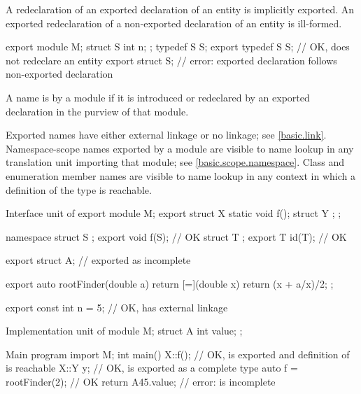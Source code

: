 \pnum
A redeclaration of an exported declaration of an entity
is implicitly exported.
An exported redeclaration of a non-exported declaration
of an entity is ill-formed.
\begin{example}
\begin{codeblock}
export module M;
struct S { int n; };
typedef S S;
export typedef S S;             // OK, does not redeclare an entity
export struct S;                // error: exported declaration follows non-exported declaration
\end{codeblock}
\end{example}

\pnum
A name is  by a module
if it is introduced or redeclared
by an exported declaration in the purview of that module.
\begin{note}
Exported names have either external linkage or no linkage; see \ref{basic.link}.
Namespace-scope names exported by a module are visible to name lookup
in any translation unit importing that module; see \ref{basic.scope.namespace}.
Class and enumeration member names are visible to name lookup in any
context in which a definition of the type is reachable.
\end{note}
\begin{example}
\begin{codeblocktu}{Interface unit of }
export module M;
export struct X {
  static void f();
  struct Y { };
};

namespace {
  struct S { };
}
export void f(S);               // OK
struct T { };
export T id(T);                 // OK

export struct A;                //  exported as incomplete

export auto rootFinder(double a) {
  return [=](double x) { return (x + a/x)/2; };
}

export const int n = 5;         // OK,  has external linkage
\end{codeblocktu}

\begin{codeblocktu}{Implementation unit of }
module M;
struct A {
  int value;
};
\end{codeblocktu}

\begin{codeblocktu}{Main program}
import M;
int main() {
  X::f();                       // OK,  is exported and definition of  is reachable
  X::Y y;                       // OK,  is exported as a complete type
  auto f = rootFinder(2);       // OK
  return A{45}.value;           // error:  is incomplete
}
\end{codeblocktu}
\end{example}

